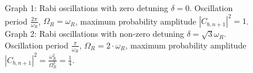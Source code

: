 \begin{figure}
\centering



\caption{Graph 1: Rabi oscillations with zero detuning $\delta = 0$. Oscillation period $\frac{2 \pi}{\omega_R}$, $\Omega_R = \omega_R$, maximum probability amplitude $\left|C_{b,n+1}\right|^2 = 1$. Graph 2: Rabi oscillations with non-zero detuning $\delta = \sqrt{3}\omega_R$. Oscillation period $\frac{\pi}{\omega_R}$, $\Omega_R = 2 \cdot \omega_R$, maximum probability amplitude $\left|C_{b,n+1}\right|^2 = \frac{\omega_R^2}{\Omega_R^2} = \frac{1}{4}$.} 
\label{figPart1InteractionRabiDelta}
\end{figure}
